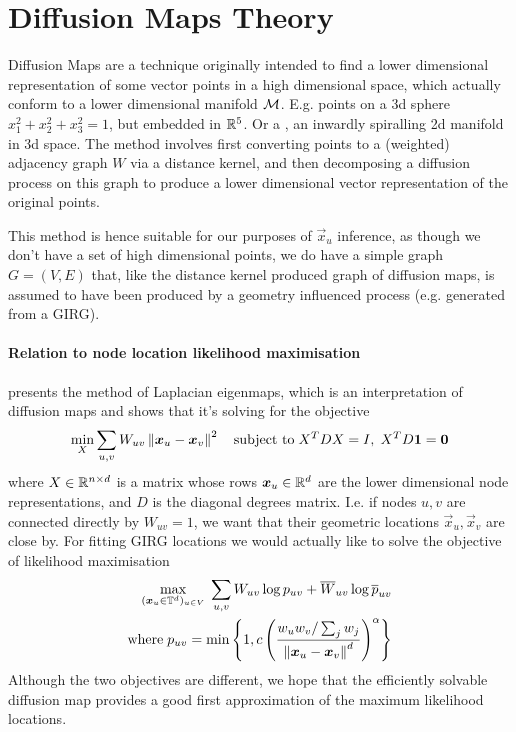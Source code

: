 \section{Diffusion Maps Theory}
\label{sec:diff_maps_theory_major}
Diffusion Maps \cite{coifman2006diffusion} are a technique originally intended to find a lower dimensional representation of some vector points in a high dimensional space, which actually conform to a lower dimensional manifold $\mathcal{M}$. E.g. points on a 3d sphere $x_1^2 + x_2^2 + x_3^2 = 1$, but embedded in $\mathbb{R}^5$. Or a , an inwardly spiralling 2d manifold in 3d space. The method involves first converting points to a (weighted) adjacency graph $W$ via a distance kernel, and then decomposing a diffusion process on this graph to produce a lower dimensional vector representation of the original points.

This method is hence suitable for our purposes of $\vec{x}_u$ inference, as though we don't have a set of high dimensional points, we do have a simple graph $G = (V,E)$ that, like the distance kernel produced graph of diffusion maps, is assumed to have been produced by a geometry influenced process (e.g. generated from a GIRG).

\paragraph{Relation to node location likelihood maximisation}
\cite{belkin2001laplacian} presents the method of Laplacian eigenmaps, which is an interpretation of diffusion maps and shows that it's solving for the objective
\begin{equation*}
  \min_{X} \sum_{u, v} W_{uv} \left\lVert \bm{x}_u - \bm{x}_v\right\rVert^2 \quad \text{subject to}\; X^T D X = I,\; X^T D\bm{1} = \bm{0} 
\end{equation*}
where $X \in \mathbb{R}^{n \times d}$ is a  matrix whose rows $\bm{x}_u \in \mathbb{R}^d$ are the lower dimensional node representations, and $D$ is the diagonal degrees matrix. I.e. if nodes $u, v$ are connected directly by $W_{uv} = 1$, we want that their geometric locations $\vec{x}_u, \vec{x}_v$ are close by.
For fitting GIRG locations we would actually like to solve the objective of likelihood maximisation
\begin{align*}
  \max\limits_{(\bm{x}_u \in \mathbb{T}^d)_{u \in V}} \;
  \sum_{u, v} W_{uv} \log p_{uv} + \overline{W}_{uv} \log \overline{p}_{uv}
  \\
  \text{where}\; p_{uv} = \min \left \{
    1, c \left ( \frac{w_u w_v / \sum_j w_j}{\left\lVert \bm{x}_u - \bm{x}_v\right\rVert^d} \right )^\alpha
  \right \}
\end{align*}
Although the two objectives are different, we hope that the efficiently solvable diffusion map provides a good first approximation of the maximum likelihood locations.


